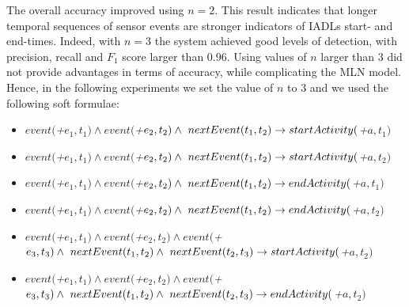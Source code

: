 \documentclass[10pt, conference, compsocconf]{IEEEtran}
\begin{document}
The overall accuracy improved using $n=2$. This result indicates that longer
temporal sequences of sensor events are stronger indicators of IADLs start-
and end-times. Indeed, with $n=3$ the system achieved good levels of detection,
with precision, recall and $F_1$ score larger than $0.96$. Using values of $n$ larger
than $3$ did not provide advantages in terms of accuracy, while complicating the MLN model. 
Hence, in the following experiments we set the value of $n$ to $3$ and
we used the following soft formulae:
\begin{itemize}
\item $event($\textit{+}$e_1,t_1) \land event($\textit{+}$e_2,t_2)  \land \ nextEvent(t_1,t_2)  \rightarrow \\startActivity($\textit{+}$a,t_1)$
\item $event($\textit{+}$e_1,t_1) \land event($\textit{+}$e_2,t_2)  \land \ nextEvent(t_1,t_2)  \rightarrow \\startActivity($\textit{+}$a,t_2)$
\item $event($\textit{+}$e_1,t_1) \land event($\textit{+}$e_2,t_2) \land \ nextEvent(t_1,t_2)  \rightarrow \\endActivity($\textit{+}$a,t_1)$
\item $event($\textit{+}$e_1,t_1) \land event($\textit{+}$e_2,t_2) \land \ nextEvent(t_1,t_2)  \rightarrow \\endActivity($\textit{+}$a,t_2)$
\item $event($\textit{+}$e_1,t_1) \land event($\textit{+}$e_2,t_2) \land event($\textit{+}$e_3,t_3) \land \ nextEvent(t_1,t_2) \land \ nextEvent(t_2,t_3)  \rightarrow \\startActivity($\textit{+}$a,t_2)$
\item $event($\textit{+}$e_1,t_1) \land event($\textit{+}$e_2,t_2) \land event($\textit{+}$e_3,t_3) \land \ nextEvent(t_1,t_2) \land \ nextEvent(t_2,t_3)  \rightarrow \\endActivity($\textit{+}$a,t_2)$
\end{itemize}
\end{document}
